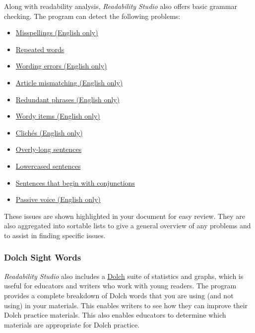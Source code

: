 \documentclass[
]{book}
\providecommand{\tightlist}{%
  \setlength{\itemsep}{0pt}\setlength{\parskip}{0pt}}
\theoremstyle{definition}
\theoremstyle{definition}
\theoremstyle{definition}
\theoremstyle{definition}
\theoremstyle{remark}
\begin{document}
Along with readability analysis, \emph{Readability Studio} also offers basic grammar checking. The program can detect the following problems:

\begin{itemize}
\tightlist
\item
  \protect\hyperlink{reviewing-misspellings}{Misspellings (English only)}
\item
  \protect\hyperlink{reviewing-repeated-words}{Repeated words}
\item
  \protect\hyperlink{reviewing-wording-errors}{Wording errors (English only)}
\item
  \protect\hyperlink{reviewing-article-mismatches}{Article mismatching (English only)}
\item
  \protect\hyperlink{reviewing-redundant-phrases}{Redundant phrases (English only)}
\item
  \protect\hyperlink{reviewing-wordy-items}{Wordy items (English only)}
\item
  \protect\hyperlink{reviewing-cliches}{Clichés (English only)}
\item
  \protect\hyperlink{reviewing-sentences-breakdown}{Overly-long sentences}
\item
  \protect\hyperlink{reviewing-lowercased-sentences}{Lowercased sentences}
\item
  \protect\hyperlink{reviewing-conjunction-sentences}{Sentences that begin with conjunctions}
\item
  \protect\hyperlink{reviewing-passive-voice}{Passive voice (English only)}
\end{itemize}

These issues are shown highlighted in your document for easy review. They are also aggregated into sortable lists to give a general overview of any problems and to assist in finding specific issues.

\hypertarget{dolch-sight-words}{%
\subsubsection*{Dolch Sight Words}\label{dolch-sight-words}}

\emph{Readability Studio} also includes a \protect\hyperlink{reviewing-dolch}{Dolch} suite of statistics and graphs, which is useful for educators and writers who work with young readers. The program provides a complete breakdown of Dolch words that you are using (and not using) in your materials. This enables writers to see how they can improve their Dolch practice materials. This also enables educators to determine which materials are appropriate for Dolch practice.
\end{document}
